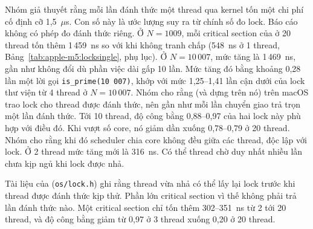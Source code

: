 Nhóm giả thuyết rằng mỗi lần đánh thức một thread qua kernel tốn một chi phí cố định cỡ 1,5~$\mu$s. Con
số này là ước lượng suy ra từ chính số đo lock. Báo cáo không có phép đo đánh thức riêng. Ở
$N = 1009$, mỗi critical section của  ở 20 thread tốn thêm 1\,459~ns so với khi không
tranh chấp (548~ns ở 1 thread, Bảng~\ref{tab:apple-m5:locksingle}, phụ lục). Ở $N = 10\,007$, mức tăng là 1\,469~ns, gần như không đổi dù phần việc dài gấp 10 lần. Mức
tăng đó bằng khoảng 0,28 lần một lời gọi \texttt{is\_prime(10\,007)}, khớp với mức 1,25--1,41 lần cận
dưới của lock thư viện từ 4 thread ở $N = 10\,007$. Nhóm cho rằng  (và  dựng
trên nó) trên macOS trao lock cho thread được đánh thức, nên gần như mỗi lần chuyển giao trả trọn một
lần đánh thức. Tới 10 thread, độ công bằng 0,88--0,97 của hai lock này phù hợp với điều đó. Khi vượt
số core, nó giảm dần xuống 0,78--0,79 ở 20 thread. Nhóm cho rằng khi đó scheduler chia core không đều
giữa các thread, độc lập với lock. Ở 2 thread mức tăng mới là 316~ns. Có thể thread chờ duy nhất nhiều lần chưa kịp ngủ
khi lock được nhả.

Tài liệu của  (\texttt{os/lock.h}) ghi rằng thread vừa nhả có thể lấy lại lock
trước khi thread được đánh thức kịp thử. Phần lớn critical section vì thế không phải trả lần đánh thức
nào. Một critical section chỉ tốn thêm 302--351~ns từ 2 tới 20 thread, và độ công bằng giảm từ 0,97 ở 3
thread xuống 0,20 ở 20 thread.

